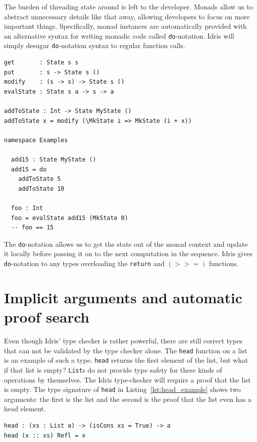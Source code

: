 \documentclass[12pt]{report}
\begin{document}
The burden of threading state around is left to the developer.
Monads allow us to abstract unnecessary details like that away, allowing developers to focus on more important things.
Specifically, monad instances are automatically provided with an alternative syntax for writing monadic code called \texttt{do}-notation.
Idris will simply desugar \texttt{do}-notation syntax to regular function calls.

\begin{lstlisting}[caption={Threading state through function calls with do-notation},label={lst:threading_state_do_notation}]
get       : State s s
put       : s -> State s ()
modify    : (s -> s) -> State s ()
evalState : State s a -> s -> a

addToState : Int -> State MyState ()
addToState x = modify (\MkState i => MkState (i + x))

namespace Examples

  add15 : State MyState ()
  add15 = do
    addToState 5
    addToState 10

  foo : Int
  foo = evalState add15 (MkState 0)
  -- foo == 15
\end{lstlisting}

The \texttt{do}-notation allows us to get the state out of the monad context and update it locally before passing it on to the next computation in the sequence.
Idris gives \texttt{do}-notation to any types overloading the \texttt{return} and $(>>=)$ functions.

\section{Implicit arguments and automatic proof search}

Even though Idris' type checker is rather powerful, there are still correct types that can not be validated by the type checker alone.
The \lstinline{head} function on a list is an example of such a type.
\lstinline{head} returns the first element of the list, but what if that list is empty?
\texttt{List}s do not provide type safety for these kinds of operations by themselves.
The Idris type-checker will require a proof that the list is empty.
The type signature of \texttt{head} in Listing~\ref{lst:head_example} shows two arguments: the first is the list and the second is the proof that the list even has a head element.

\begin{lstlisting}[caption={Taking the head of a list},label={lst:head_example}]
head : (xs : List a) -> (isCons xs = True) -> a
head (x :: xs) Refl = x
\end{lstlisting}
\end{document}
